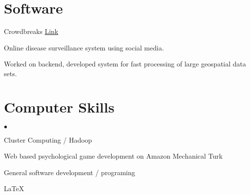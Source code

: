 \documentclass[margin,line]{res}
\newcommand{\linkToUrl}[1]{\underline{\color{blue} \href{#1}{Link}}}
\newenvironment{list1}{
  \begin{list}{\ding{113}}{%
      \setlength{\itemsep}{0in}
      \setlength{\parsep}{0in} \setlength{\parskip}{0in}
      \setlength{\topsep}{0in} \setlength{\partopsep}{0in} 
      \setlength{\leftmargin}{0.17in}}}{\end{list}}
\newenvironment{list2}{
  \begin{list}{$\bullet$}{%
      \setlength{\itemsep}{0in}
      \setlength{\parsep}{0in} \setlength{\parskip}{0in}
      \setlength{\topsep}{0in} \setlength{\partopsep}{0in} 
      \setlength{\leftmargin}{0.2in}}}{\end{list}}
\begin{document}
\begin{resume}
\section{\sc Software}
Crowdbreaks \linkToUrl{http://www.crowdbreaks.com}
\begin{list1}
\item[] Online disease surveillance system using social media.
\item[] Worked on backend, developed system for fast processing of large geospatial data sets.
\end{list1}

\section{\sc Computer Skills} 
\begin{list2}
\item Cluster Computing / Hadoop 
\item Web based psychological game development on Amazon Mechanical Turk
\item General software development / programing
\item \LaTeX
\end{list2}




\end{resume}
\end{document}
